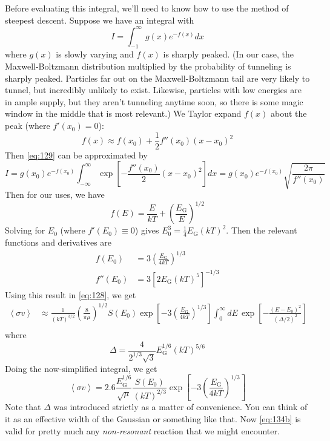 \documentclass[10pt]{article}
\numberwithin{equation}{section}
\newcommand{\avg}[1]{\left\langle#1\right\rangle}
\begin{document}
  Before evaluating this integral, we'll need to know how to use the
  method of steepest descent. Suppose we have an integral with
  \begin{equation}
    \label{eq:129}
    I=\int_{-1}^{\infty}g(x)e^{-f(x)}dx
  \end{equation}
  where $g(x)$ is slowly varying and $f(x)$ is sharply peaked. (In our
  case, the Maxwell-Boltzmann distribution multiplied by the
  probability of tunneling is sharply peaked. Particles far out on the
  Maxwell-Boltzmann tail are very likely to tunnel, but incredibly
  unlikely to exist. Likewise, particles with low energies are in
  ample supply, but they aren't tunneling anytime soon, so there is
  some magic window in the middle that is most relevant.) We Taylor
  expand $f(x)$ about the peak (where $f'(x_0)=0$):
  \begin{equation}
    \label{eq:130}
    f(x)\approx f(x_0)+\frac{1}{2}f''(x_0)(x-x_0)^2
  \end{equation}
  Then \eqref{eq:129} can be approximated by
  \begin{equation}
    \label{eq:131}
    I=g(x_0)e^{-f(x_0)}\int_{-\infty}^{\infty}\exp\left[-\frac{f''(x_0)}{2}
(x-x_0)^2\right]dx=g(x_0)e^{-f(x_0)}\sqrt{\frac{2\pi}{f''(x_0)}}
  \end{equation}
  Then for our uses, we have
  \begin{equation}
    \label{eq:132}
    f(E)=\frac{E}{kT}+\left(\frac{E_{\mathrm{G}}}{E}\right)^{1/2}
  \end{equation}
  Solving for $E_0$ (where $f'(E_0)\equiv 0$) gives
  $E_0^3=\frac{1}{4}E_{\mathrm{G}}(kT)^2$. Then the relevant functions
  and derivatives are
  \begin{align}
    \label{eq:133}
    f(E_0)&=3\left(\frac{E_{\mathrm{G}}}{4kT}\right)^{1/3}\\
    \label{eq:133a}
    f''(E_0)&=3\left[2E_{\mathrm{G}}(kT)^5\right]^{-1/3}
  \end{align}
  Using this result in \eqref{eq:128}, we get
  \begin{align}
    \label{eq:134}
    \avg{\sigma v} & \approx
    \frac{1}{(kT)^{3/2}}\left(\frac{8}{\pi\mu}\right)^{1/2}S(E_0)\exp\left
[-3\left(\frac{E_{\mathrm{G}}}{4kT}\right)^{1/3}\right]\int_0^\infty dE\,
    \exp\left[-\frac{(E-E_0)^2}{(\Delta/2)^2}\right]\\
  \end{align}
	where
	\begin{equation}
    \label{eq:134a}
  	\boxed{\Delta =
      \frac{4}{2^{1/3}\sqrt{3}}E_{\mathrm{G}}^{1/6}(kT)^{5/6}}		
	\end{equation}
	Doing the now-simplified integral, we get
	\begin{equation}
    \label{eq:134b} \boxed{\avg{\sigma v} =
    2.6\frac{E_{\mathrm{G}}^{1/6}}{\sqrt{\mu}} \frac{S(E_0)}{(kT)^{2/3}}
    \exp\left[-3\left(\frac{E_{\mathrm{G}}}{4kT}\right)^{1/3}\right] }
	\end{equation}
  Note that $\Delta$ was introduced strictly as a matter of
  convenience. You can think of it as an effective width of the
  Gaussian or something like that. Now \eqref{eq:134b} is valid for
  pretty much any \emph{non-resonant} reaction that we might
  encounter.\\
\end{document}
